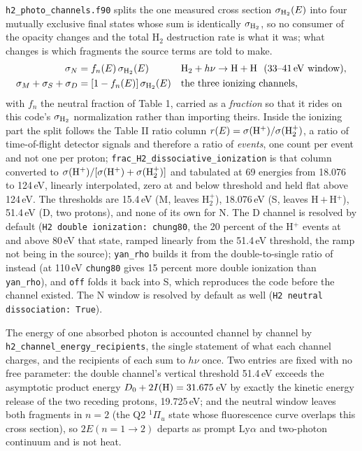 \texttt{h2\_photo\_channels.f90} splits the one measured cross section
$\sigma_{\rm H_2}(E)$ into four mutually exclusive final states whose sum is
identically $\sigma_{\rm H_2}$, so no consumer of the opacity changes and
the total H$_2$ destruction rate is what it was; what changes is which
fragments the source terms are told to make.
\begin{align}
\sigma_N &= f_n(E)\,\sigma_{\rm H_2}(E)
  &&{\rm H_2}+h\nu\to{\rm H}+{\rm H}\ \ (33\text{--}41\,{\rm eV\ window}),
  \label{eq:mol:chanN}\\
\sigma_M+\sigma_S+\sigma_D &= \left[1-f_n(E)\right]\sigma_{\rm H_2}(E)
  &&\text{the three ionizing channels},
  \label{eq:mol:chanMSD}
\end{align}
with $f_n$ the neutral fraction of \citet{Chung1993} Table 1, carried as
a \emph{fraction} so that it rides on this code's $\sigma_{\rm H_2}$
normalization rather than importing theirs. Inside the ionizing part the
split follows the \citeauthor{Chung1993} Table II ratio column
$r(E) = \sigma({\rm H^+})/\sigma({\rm H_2^+})$, a ratio of time-of-flight
detector signals and therefore a ratio of \emph{events}, one count per event
and not one per proton;
\texttt{frac\_H2\_dissociative\_ionization} is that column converted to
$\sigma({\rm H^+})/[\sigma({\rm H^+})+\sigma({\rm H_2^+})]$ and tabulated at
69 energies from 18.076 to 124\,eV, linearly interpolated, zero at and below
threshold and held flat above 124\,eV. The thresholds are 15.4\,eV (M,
leaves H$_2^+$), 18.076\,eV (S, leaves H\,$+$\,H$^+$), 51.4\,eV (D, two
protons), and none of its own for N. The D channel is resolved by default
(\texttt{H2 double ionization: chung80}, the 20 percent of the H$^+$
events at and above 80\,eV that \citet{Chung1993} state, ramped linearly from
the 51.4\,eV threshold, the ramp not being in the source);
\texttt{yan\_rho} builds it from the double-to-single ratio of
\citet{Yan1998} instead (at 110\,eV \texttt{chung80} gives 15 percent more
double ionization than \texttt{yan\_rho}), and
\texttt{off} folds it back into S, which reproduces the code before the
channel existed. The N window is resolved by default as well
(\texttt{H2 neutral dissociation: True}).

The energy of one absorbed photon is accounted channel by channel by
\texttt{h2\_channel\_energy\_recipients}, the single statement of what each
channel charges, and the recipients of each sum to $h\nu$ once. Two entries
are fixed with no free parameter: the double channel's vertical threshold
51.4\,eV \citep{Yan1998} exceeds the asymptotic product
energy $D_0+2I({\rm H}) = 31.675$\,eV by exactly the kinetic energy release
of the two receding protons, 19.725\,eV; and the neutral window leaves both
fragments in $n=2$ (the Q2 $^1\Pi_u$ state whose fluorescence curve overlaps
this cross section), so $2E(n{=}1\to2)$ departs as prompt Ly$\alpha$ and
two-photon continuum and is not heat.

